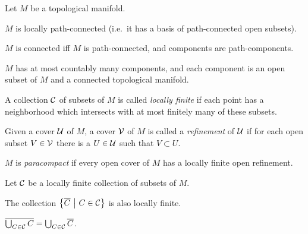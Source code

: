 \documentclass{skript}
\begin{document}
\begin{prop}
    Let $M$ be a topological manifold.
    \begin{alphanumerate}
    \item 
        $M$ is locally path-connected (i.e.\ it has a basis of path-connected open subsets).
    \item
        $M$ is connected iff $M$ is path-connected, and components are path-components.
    \item
        $M$ has at most countably many components, and each component is an open subset of $M$ and a connected topological manifold.
    \end{alphanumerate}
\end{prop}

\begin{definition}[Paracompactness]
    \begin{alphanumerate}
    \item
        A collection $\mathcal{C}$ of subsets of $M$ is called \emph{locally finite} if each point has a neighborhood which intersects with at most finitely many of these subsets.
    \item
        Given a cover $\mathcal{U}$ of $M$, a cover $\mathcal{V}$ of $M$ is called a \emph{refinement} of $\mathcal{U}$ if for each open subset $V\in \mathcal{V}$ there is a $U\in \mathcal{U}$ such that $V\subset U$.
    \item
        $M$ is \emph{paracompact} if every open cover of $M$ has a locally finite open refinement.
    \end{alphanumerate}
    
\end{definition}
    
\begin{lemma}
    Let $\mathcal{C}$ be a locally finite collection of subsets of $M$. 
    \begin{alphanumerate}
    \item
        The collection $\left\{\overline C\ \middle|\  C\in\mathcal{C}\right\}$ is also locally finite.
    \item
        $\overline{\bigcup_{C\in \mathcal{C}} C} = \bigcup_{C\in \mathcal{C}}\overline C$.
    \end{alphanumerate}
    
\end{lemma}
    
\end{document}
